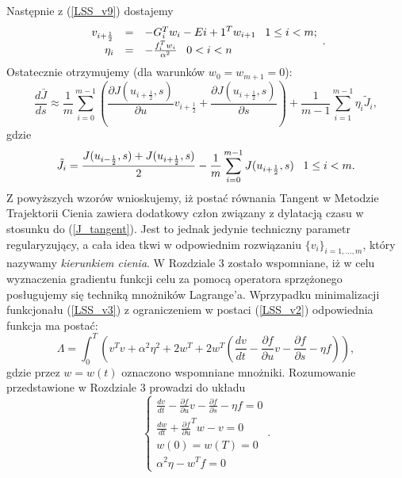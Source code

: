 \documentclass[12pt, twoside]{book}
\begin{document}
Następnie z (\ref{LSS_v9}) dostajemy
\begin{equation}
\begin{array}{rcl}
v_{i+\frac{1}{2}} &=&  -G_{i}^{T}w_{i} - E{i+1}^{T}w_{i+1} \thickspace \thickspace \thickspace 1\leq i <m;\\
\eta_{i} &=& -\frac{f_{i}^{T}w_{i}}{\alpha^{2}} \thickspace \thickspace \thickspace 0<i<n
\end{array}.
\label{LSS_v18}
\end{equation}
Ostatecznie otrzymujemy (dla warunków $ w_{0} = w_{m+1} = 0  $):
\begin{equation}
\frac{d\bar{J}}{ds} \approx \frac{1}{m}\sum_{i=0}^{m-1}(\frac{\partial{J(u_{i+\frac{1}{2}},s)}}{\partial{u}}v_{i+\frac{1}{2}} + \frac{\partial{J(u_{i+\frac{1}{2}},s)}}{\partial{s}}) + \frac{1}{m-1}\sum_{i=1}^{m-1}\eta_{i}\tilde{J}_{i},
\label{LSS_v19}
\end{equation}
gdzie 
\begin{equation}
\tilde{J}_{i} = \frac{J(u_{i-\frac{1}{2}},s)+J(u_{i+\frac{1}{2}},s)}{2} - \frac{1}{m}\sum_{i=0}^{m-1}J(u_{i+\frac{1}{2}},s) \thickspace \thickspace \thickspace 1\leq i < m.
\label{LSS_v20}
\end{equation}
Z powyższych wzorów wnioskujemy, iż postać równania Tangent w Metodzie Trajektorii Cienia zawiera dodatkowy człon związany z dylatacją czasu w stosunku do (\ref{J_tangent}). Jest to jednak jedynie techniczny parametr regularyzujący, a cała idea tkwi w odpowiednim rozwiązaniu $ \{v_{i}\}_{i=1,...,m} $, który nazywamy \textit{kierunkiem cienia}.\newline
W Rozdziale 3 zostało wspomniane, iż w celu wyznaczenia gradientu funkcji celu za pomocą operatora sprzężonego posługujemy się techniką mnożników Lagrange'a. Wprzypadku minimalizacji funkcjonału (\ref{LSS_v3}) z ograniczeniem w postaci (\ref{LSS_v2}) odpowiednia funkcja ma postać:
\begin{equation}
\Lambda = \int_{0}^{T}(v^{T}v + \alpha^{2}\eta^{2}+2w^{T} + 2w^{T}(\frac{dv}{dt}-\frac{\partial{f}}{\partial{u}}v-\frac{\partial{f}}{\partial{s}}-\eta f)),
\label{LSS_v21}
\end{equation}
gdzie przez $ w = w(t) $ oznaczono wspomniane mnożniki. Rozumowanie przedstawione w Rozdziale 3 prowadzi do układu
\begin{equation}
\begin{cases}
	\frac{dv}{dt}-\frac{\partial{f}}{\partial{u}}v-\frac{\partial{f}}{\partial{s}}-\eta f = 0 \\
	\frac{dw}{dt} + \frac{\partial{f}}{\partial{u}}^{T}w-v = 0 \\
	w(0) = w(T) = 0 \\
	\alpha^{2}\eta -w^{T}f = 0
\end{cases}.
\label{LSS_v22}
\end{equation}
\end{document}
